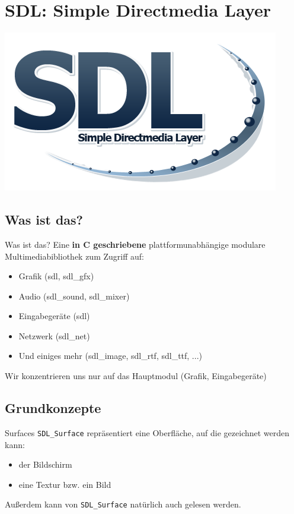 \section{SDL: Simple Directmedia Layer}
\begin{frame}
	\includegraphics[width=\textwidth]{images/SDL_logo.png}
\end{frame}

\subsection{Was ist das?}
\begin{frame}{Was ist das?}
	Eine \textbf{in C geschriebene} plattformunabhängige modulare Multimediabibliothek zum Zugriff auf:
	\begin{itemize}
		\item Grafik (sdl, sdl\_gfx)
		\item Audio (sdl\_sound, sdl\_mixer)
		\item Eingabegeräte (sdl)
		\item Netzwerk (sdl\_net)
		\item Und einiges mehr (sdl\_image, sdl\_rtf, sdl\_ttf, ...)
	\end{itemize}
	
	Wir konzentrieren uns nur auf das Hauptmodul (Grafik, Eingabegeräte)
\end{frame}

\subsection{Grundkonzepte}
\begin{frame}[fragile]{Surfaces}
	\texttt{SDL\_Surface} repräsentiert eine Oberfläche, auf die gezeichnet werden kann:
	\begin{itemize}
		\item der Bildschirm
		\item eine Textur bzw. ein Bild
	\end{itemize}
	Außerdem kann von \verb|SDL_Surface| natürlich auch gelesen werden.
\end{frame}

